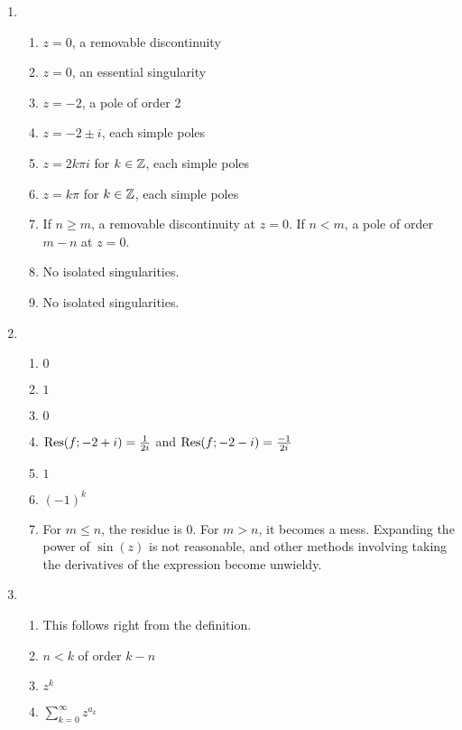 \begin{enumerate}
	\item \begin{enumerate}
		\item $z = 0$, a removable discontinuity
		\item $z = 0$, an essential singularity
		\item $z = -2$, a pole of order 2
		\item $z = -2 \pm i$, each simple poles
		\item $z = 2k\pi i$ for $k\in \mathbb{Z}$, each simple poles
		\item $z = k\pi$ for $k\in \mathbb{Z}$, each simple poles
		\item If $n \ge m$, a removable discontinuity at $z = 0$. If $n < m$, a pole of order $m-n$ at $z = 0$.
		\item No isolated singularities.
		\item No isolated singularities.
	
	\end{enumerate}

	\item \begin{enumerate}
		\item $0$
		\item $1$
		\item $0$
		\item $\mathrm{Res}(f;-2+i) = \frac{1}{2i}$ and $\mathrm{Res}(f;-2-i) = \frac{-1}{2i}$
		\item $1$
		\item $(-1)^k$
		\item For $m\le n$, the residue is $0$. For $m > n$, it becomes a mess. Expanding the power of $\sin(z)$ is not reasonable, and other methods involving taking the derivatives of the expression become unwieldy.
		
		
	
	\end{enumerate}
	
	
	\item \begin{enumerate}
		\item This follows right from the definition.
		\item $n < k$ of order $k-n$
		\item $z^k$
		\item $\sum_{k = 0}^\infty z^{a_k}$
	\end{enumerate}
	

\end{enumerate}
